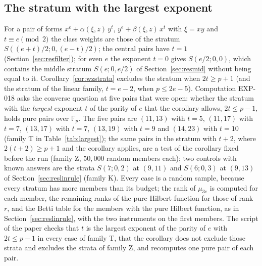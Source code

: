\documentclass[11pt]{article}
\theoremstyle{definition}
\theoremstyle{remark}
\newcommand{\EXP}[1]{\mbox{EXP-#1}}
\newcommand{\F}{\mathbb{F}}
\begin{document}
\subsection{The stratum with the largest exponent}
\label{sec:reslargest}

For a pair of forms $x^e+\alpha(\xi,z)\,y^t$, $y^e+\beta(\xi,z)\,x^t$ with $\xi=xy$ and $t\equiv e\pmod 2$ the class weights are those of the stratum $S((e+t)/2;0,(e-t)/2)$; the central pairs have $t=1$ (Section~\ref{sec:resfilter}); for even $e$ the exponent $t=0$ gives $S(e/2;0,0)$, which contains the middle stratum $S(e;0,e/2)$ of Section~\ref{sec:resmid} without being equal to it. Corollary~\ref{cor:wzstrata} excludes the stratum when $2t\ge p+1$ (and the stratum of the linear family, $t=e-2$, when $p\le2e-5$). Computation \EXP{018} asks the converse question at five pairs that were open: whether the stratum with the \emph{largest} exponent $t$ of the parity of $e$ that the corollary allows, $2t\le p-1$, holds pure pairs over $\F_p$. The five pairs are $(11,13)$ with $t=5$, $(11,17)$ with $t=7$, $(13,17)$ with $t=7$, $(13,19)$ with $t=9$ and $(14,23)$ with $t=10$ (family T in Table~\ref{tab:largest}); the same pairs in the stratum with $t+2$, where $2(t+2)\ge p+1$ and the corollary applies, are a test of the corollary fixed before the run (family Z, $50{,}000$ random members each); two controls with known answers are the strata $S(7;0,2)$ at $(9,11)$ and $S(6;0,3)$ at $(9,13)$ of Section~\ref{sec:reslinrule} (family K). Every case is a random sample, because every stratum has more members than its budget; the rank of $\mu_{3e}$ is computed for each member, the remaining ranks of the pure Hilbert function for those of rank $r$, and the Betti table for the members with the pure Hilbert function, as in Section~\ref{sec:reslinrule}, with the two instruments on the first members. The script of the paper checks that $t$ is the largest exponent of the parity of $e$ with $2t\le p-1$ in every case of family T, that the corollary does not exclude those strata and excludes the strata of family Z, and recomputes one pure pair of each pair.

\begin{table}[htbp]
\centering\scriptsize

\caption{The strata of \EXP{018}: the family (the control strata of Section~\ref{sec:reslinrule}; the stratum with the largest exponent $t$ allowed by the corollary; the stratum with $t+2$), the pair, the stratum, the exponent $t=2m-e$, the members examined, those of rank $r$, with the pure Hilbert function, the Betti tables computed and the pure ones.}
\label{tab:largest}
\end{table}
\end{document}
